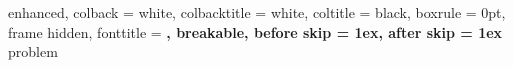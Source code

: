 \usepackage{titlesec}
\usepackage[many]{tcolorbox}

\titlespacing*{\chapter}{0cm}{-2.0cm}{0.50cm}
\titlespacing*{\section}{0cm}{0.50cm}{0.25cm}

\setlength{\parindent}{0pt}
\setlength{\parskip}{0.6ex}


%
    {enhanced,
    colback = white,
    colbacktitle = white,
    coltitle = black,
    boxrule = 0pt,
    frame hidden,
    fonttitle = \bfseries\sffamily,
    breakable,
    before skip = 1ex,
    after skip = 1ex
}{problem}


